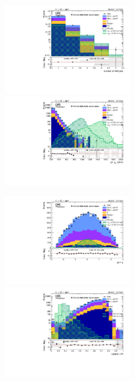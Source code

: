 \begin{figure}[!htb]
  \begin{center}
    \includegraphics[width=0.495\textwidth]{plots/v9_U/XVZnnhpSR/nFatJets.pdf}  
    \includegraphics[width=0.495\textwidth]{plots/v9_U/XVZnnhpSR/FatJet1_pt.pdf}
    
    \includegraphics[width=0.495\textwidth]{plots/v9_U/XVZnnhpSR/FatJet1_eta.pdf}
    \includegraphics[width=0.495\textwidth]{plots/v9_U/XVZnnhpSR/FatJet1_dR.pdf}


\end{center}
\end{figure}
